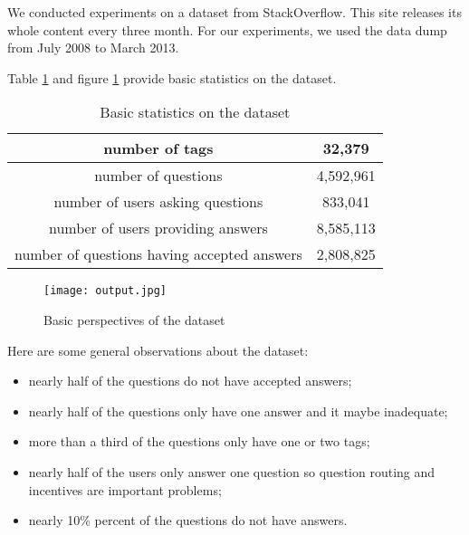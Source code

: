 {{{{{{{%
We conducted experiments on a dataset from StackOverflow. This site releases its whole content every three month. For our experiments, we used the data dump from July 2008 to March 2013. 

Table \ref{tab:basicinfo} and figure \ref{fig:basicstat} provide basic statistics on the dataset.
\begin{table}[htp]
\caption{Basic statistics on the dataset}
\label{tab:basicinfo}
\centering
\begin{tabular}{|c|c|}
\hline
number of tags & 32,379\\ \hline
number of questions & 4,592,961 \\ \hline
number of users asking questions & 833,041 \\ \hline
number of users providing answers & 8,585,113\\ \hline
number of questions having accepted answers & 2,808,825\\ \hline

\end{tabular}
\end{table}

\begin{figure}
\centering
\texttt{[image: output.jpg]}  
\caption{Basic perspectives of the dataset}
\label{fig:basicstat} 
\end{figure}


%


Here are some general observations about the dataset: 
\begin{itemize}
    \item nearly half of the questions do not have accepted answers;
    \item nearly half of the questions only have one answer and it maybe inadequate;
    \item more than a third of the questions only have one or two tags;
    \item nearly half of the users only answer one question so question routing and incentives are important problems;
    \item nearly 10\% percent of the questions do not have answers.
\end{itemize}


}}}}}}}
